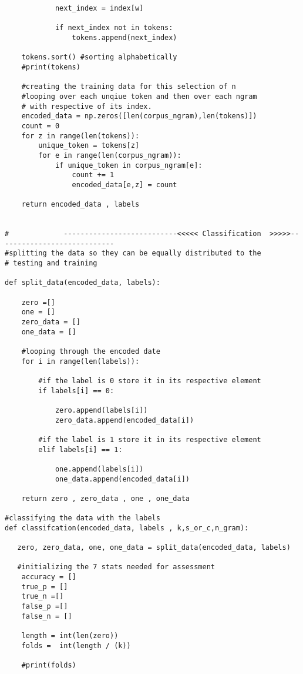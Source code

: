 \documentclass[12pt]{article}
\begin{document}
\begin{enumerate}
\begin{flushleft}
\begin{lstlisting}
            next_index = index[w]

            if next_index not in tokens:
                tokens.append(next_index)
                
    tokens.sort() #sorting alphabetically
    #print(tokens)
    
    #creating the training data for this selection of n
    #looping over each unqiue token and then over each ngram
    # with respective of its index.
    encoded_data = np.zeros([len(corpus_ngram),len(tokens)])
    count = 0
    for z in range(len(tokens)):
        unique_token = tokens[z]
        for e in range(len(corpus_ngram)):
            if unique_token in corpus_ngram[e]:
                count += 1
                encoded_data[e,z] = count

    return encoded_data , labels


#             ---------------------------<<<<< Classification  >>>>>----------------------------
#splitting the data so they can be equally distributed to the
# testing and training

def split_data(encoded_data, labels):

    zero =[]
    one = []
    zero_data = []
    one_data = []
    
    #looping through the encoded date
    for i in range(len(labels)):
    
        #if the label is 0 store it in its respective element
        if labels[i] == 0:
        
            zero.append(labels[i])
            zero_data.append(encoded_data[i])
            
        #if the label is 1 store it in its respective element
        elif labels[i] == 1:
        
            one.append(labels[i])
            one_data.append(encoded_data[i])

    return zero , zero_data , one , one_data

#classifying the data with the labels
def classifcation(encoded_data, labels , k,s_or_c,n_gram):

   zero, zero_data, one, one_data = split_data(encoded_data, labels)
    
   #initializing the 7 stats needed for assessment
    accuracy = []
    true_p = []
    true_n =[]
    false_p =[]
    false_n = []
    
    length = int(len(zero))
    folds =  int(length / (k))
    
    #print(folds)


\end{lstlisting}
\end{flushleft}
\end{enumerate}
\end{document}
